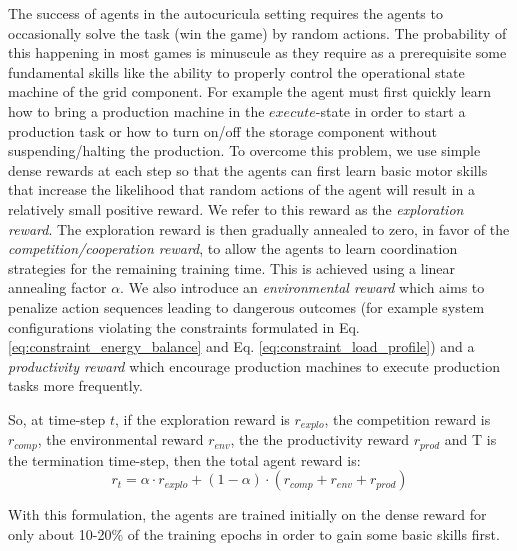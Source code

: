 The success of agents in the autocuricula setting requires the agents to occasionally solve the task (win the game) by random actions. The probability of this happening in most games is minuscule as they require as a prerequisite some fundamental skills like the ability to properly control the operational state machine of the grid component. For example the agent must first quickly learn how to bring a production machine in the $execute$-state in order to start a production task or how to turn on/off the storage component without suspending/halting the production. To overcome this problem, we use simple dense rewards at each step so that the agents can first learn basic motor skills that increase the likelihood that random actions of the agent will result in a relatively small positive reward. We refer to this reward as the \textit{exploration reward}. The exploration reward is then gradually annealed to zero, in favor of the \textit{competition/cooperation reward}, to allow the agents to learn coordination strategies for the remaining training time. This is achieved using a linear annealing factor $\alpha$. We also introduce an \textit{environmental reward} which aims to penalize action sequences leading to dangerous outcomes (for example system configurations violating the constraints formulated in Eq. \ref{eq:constraint_energy_balance} and Eq. \ref{eq:constraint_load_profile}) and a \textit{productivity reward} which encourage production machines to execute production tasks more frequently. 

So, at time-step $t$, if the exploration reward is $r_{explo}$, the competition reward is $r_{comp}$, the environmental reward $r_{env}$, the the productivity reward $r_{prod}$ and T is the termination time-step, then the total agent reward is:
\begin{equation}
\label{eq:total_reward}	
	r_t = \alpha \cdot r_{explo} + (1 - \alpha) \cdot (r_{comp} + r_{env} + r_{prod})
\end{equation} 

With this formulation, the agents are trained initially on the dense reward for only about 10-20\% of the training epochs in order to gain some basic skills first. 
